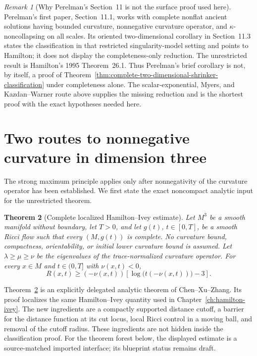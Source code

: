 \documentclass[10pt]{coll-l}
\newtheorem{theorem}{Theorem}[chapter]
\theoremstyle{definition}
\theoremstyle{remark}
\newtheorem{remark}[theorem]{Remark}
\numberwithin{section}{chapter}
\numberwithin{equation}{chapter}
\begin{document}
\begin{remark}[Why Perelman's Section~11 is not the surface proof used here]
\label{rem:perelman-not-surface-classification-proof}
Perelman's first paper, Section~11.1, works with complete nonflat ancient
solutions having bounded curvature, nonnegative curvature operator, and
$\kappa$-noncollapsing on all scales.  Its oriented two-dimensional
corollary in Section~11.3 states the classification in that restricted
singularity-model setting and points to Hamilton; it does not display the
completeness-only reduction.  The unrestricted result is Hamilton's 1995
Theorem~26.1.  Thus Perelman's brief corollary is not, by itself, a proof of
Theorem~\ref{thm:complete-two-dimensional-shrinker-classification} under
completeness alone.  The scalar-exponential, Myers, and Kazdan--Warner route
above supplies the missing reduction and is the shortest proof with the
exact hypotheses needed here.
\end{remark}

\section[Nonnegative curvature in dimension three]
{Two routes to nonnegative curvature in dimension three}
\label{sec:shrinker-nonnegative-curvature}

The strong maximum principle applies only after nonnegativity of the
curvature operator has been established.  We first state the exact
noncompact analytic input for the unrestricted theorem.

\begin{theorem}[Complete localized Hamilton--Ivey estimate]
\label{thm:complete-localized-hamilton-ivey}
Let $M^3$ be a smooth manifold without boundary, let $T>0$, and let $g(t)$,
$t\in[0,T]$, be a smooth Ricci flow such that every $(M,g(t))$ is complete.
No curvature bound, compactness, orientability, or initial lower curvature
bound is assumed.  Let $\lambda\geq\mu\geq\nu$ be the eigenvalues of the
trace-normalized curvature operator.  For every $x\in M$ and
$t\in(0,T]$ with $\nu(x,t)<0$,
\begin{equation}
 R(x,t)\geq(-\nu(x,t))
       \left[\log\!\bigl(t(-\nu(x,t))\bigr)-3\right].    \label{eq:complete-localized-hamilton-ivey}
\end{equation}
\end{theorem}

Theorem~\ref{thm:complete-localized-hamilton-ivey} is an explicitly
delegated analytic theorem of Chen--Xu--Zhang.  Its proof localizes the
same Hamilton--Ivey quantity used in Chapter~\ref{ch:hamilton-ivey}.  The
new ingredients are a compactly supported distance cutoff, a barrier for
the distance function at its cut locus, local Ricci control in a moving
ball, and removal of the cutoff radius.  These ingredients are not hidden
inside the classification proof.  For the theorem forest below, the
displayed estimate is a source-matched imported interface; its blueprint
status remains draft.
\end{document}
